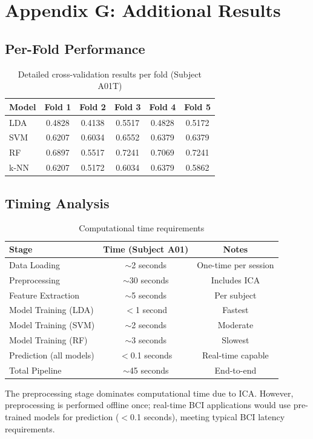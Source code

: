 \documentclass[11pt]{article}
\begin{document}
\section{Appendix G: Additional Results}

\subsection{Per-Fold Performance}

\begin{table}[H]
\centering
\caption{Detailed cross-validation results per fold (Subject A01T)}
\begin{tabular}{@{}lccccc@{}}
\toprule
\textbf{Model} & \textbf{Fold 1} & \textbf{Fold 2} & \textbf{Fold 3} & \textbf{Fold 4} & \textbf{Fold 5} \\
\midrule
LDA & 0.4828 & 0.4138 & 0.5517 & 0.4828 & 0.5172 \\
SVM & 0.6207 & 0.6034 & 0.6552 & 0.6379 & 0.6379 \\
RF & 0.6897 & 0.5517 & 0.7241 & 0.7069 & 0.7241 \\
k-NN & 0.6207 & 0.5172 & 0.6034 & 0.6379 & 0.5862 \\
\bottomrule
\end{tabular}
\end{table}

\subsection{Timing Analysis}

\begin{table}[H]
\centering
\caption{Computational time requirements}
\begin{tabular}{@{}lcc@{}}
\toprule
\textbf{Stage} & \textbf{Time (Subject A01)} & \textbf{Notes} \\
\midrule
Data Loading & $\sim$2 seconds & One-time per session \\
Preprocessing & $\sim$30 seconds & Includes ICA \\
Feature Extraction & $\sim$5 seconds & Per subject \\
Model Training (LDA) & $<$1 second & Fastest \\
Model Training (SVM) & $\sim$2 seconds & Moderate \\
Model Training (RF) & $\sim$3 seconds & Slowest \\
Prediction (all models) & $<$0.1 seconds & Real-time capable \\
\midrule
Total Pipeline & $\sim$45 seconds & End-to-end \\
\bottomrule
\end{tabular}
\end{table}

The preprocessing stage dominates computational time due to ICA. However, preprocessing is performed offline once; real-time BCI applications would use pre-trained models for prediction ($<$0.1 seconds), meeting typical BCI latency requirements.
\end{document}
